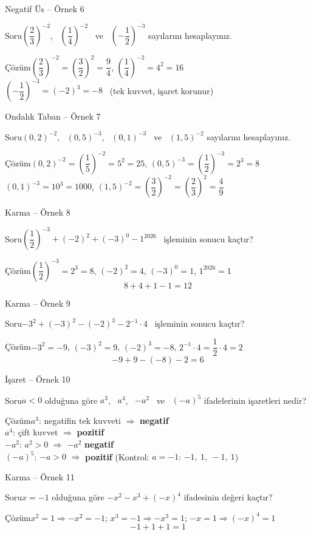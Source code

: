 \documentclass[aspectratio=169,11pt]{beamer}
\newcommand{\soru}[3]{%
\begin{frame}{#1}
  \begin{block}{Soru}\large #2\end{block}
  \pause
  \begin{exampleblock}{Çözüm}\large #3\end{exampleblock}
\end{frame}}
\begin{document}
\soru{Negatif Üs -- Örnek 6}
{\(\left(\dfrac23\right)^{-2}\), \ \(\left(\dfrac14\right)^{-2}\) \ ve \ \(\left(-\dfrac12\right)^{-3}\) sayılarını hesaplayınız.}
{\(\left(\dfrac23\right)^{-2}=\left(\dfrac32\right)^{2}=\dfrac94\), \qquad \(\left(\dfrac14\right)^{-2}=4^2=16\)\\[4pt]
\(\left(-\dfrac12\right)^{-3}=(-2)^3=-8\) \ (tek kuvvet, işaret korunur)}

\soru{Ondalık Taban -- Örnek 7}
{\((0{,}2)^{-2}\), \ \((0{,}5)^{-3}\), \ \((0{,}1)^{-3}\) \ ve \ \((1{,}5)^{-2}\) sayılarını hesaplayınız.}
{\((0{,}2)^{-2}=\left(\dfrac15\right)^{-2}=5^2=25\), \qquad \((0{,}5)^{-3}=\left(\dfrac12\right)^{-3}=2^3=8\)\\[4pt]
\((0{,}1)^{-3}=10^3=1000\), \qquad \((1{,}5)^{-2}=\left(\dfrac32\right)^{-2}=\left(\dfrac23\right)^{2}=\dfrac49\)}

\soru{Karma -- Örnek 8}
{\(\left(\dfrac12\right)^{-3}+(-2)^2+(-3)^0-1^{2026}\) \ işleminin sonucu kaçtır?}
{\(\left(\dfrac12\right)^{-3}=2^3=8\), \quad \((-2)^2=4\), \quad \((-3)^0=1\), \quad \(1^{2026}=1\)
\[8+4+1-1=12\]}

\soru{Karma -- Örnek 9}
{\(-3^2+(-3)^2-(-2)^3-2^{-1}\cdot 4\) \ işleminin sonucu kaçtır?}
{\(-3^2=-9\), \quad \((-3)^2=9\), \quad \((-2)^3=-8\), \quad \(2^{-1}\cdot 4=\dfrac12\cdot 4=2\)
\[-9+9-(-8)-2=6\]}

\soru{İşaret -- Örnek 10}
{\(a<0\) olduğuna göre \(a^3\), \ \(a^4\), \ \(-a^2\) \ ve \ \((-a)^5\) ifadelerinin işaretleri nedir?}
{\(a^3\): negatifin tek kuvveti \(\Rightarrow\) \textbf{negatif}\\[3pt]
\(a^4\): çift kuvvet \(\Rightarrow\) \textbf{pozitif}\\[3pt]
\(-a^2\): \(a^2>0\) \(\Rightarrow\) \(-a^2\) \textbf{negatif}\\[3pt]
\((-a)^5\): \(-a>0\) \(\Rightarrow\) \textbf{pozitif} \quad (Kontrol: \(a=-1\): \(-1,\ 1,\ -1,\ 1\))}

\soru{Karma -- Örnek 11}
{\(x=-1\) olduğuna göre \(-x^2-x^3+(-x)^4\) ifadesinin değeri kaçtır?}
{\(x^2=1\Rightarrow -x^2=-1\); \quad \(x^3=-1\Rightarrow -x^3=1\); \quad \(-x=1\Rightarrow(-x)^4=1\)
\[-1+1+1=1\]}
\end{document}
